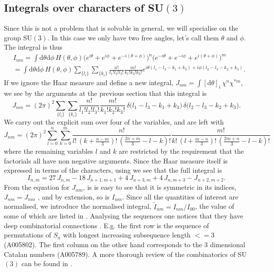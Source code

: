 \subsection{Integrals over characters of SU\texorpdfstring{$(3)$}{(3)}}

Since this is not a problem that is solvable in general, we will specialise on
the group SU$(3)$. In this case we only have two free angles, let's call them
$\theta$ and $\phi$. The integral is thus
%
\begin{align}
  &I_{nm} = \int \mathrm{d} \theta \mathrm{d} \phi \, H(\theta,\phi)
  \big(e^{i\theta} + e^{i\phi} + e^{-i(\theta + \phi)}\big)^n
  \big(e^{-i\theta} + e^{-i\phi} + e^{i(\theta + \phi)}\big)^m \nonumber\\
  &=\int \mathrm{d} \theta \mathrm{d} \phi \, H(\theta,\phi)
  \sum_{\{l_i\}} \sum_{\{k_i\}} \frac{n!}{l_1! l_2! l_3!} \frac{m!}{k_1! k_2!
    k_3!} e^{i \theta (l_1 - l_3 - k_1 + k_3) + i \phi (l_2 - l_3 - k_2 + k_3)}.
\end{align}
%
If we ignore the Haar measure and define a new integral, $J_{nm} = \int
[\mathrm{d} \theta]_i\, \chi^n \chi^{*m}$, we see by the arguments at the previous
section that this integral is
%
\begin{equation}
  J_{nm} = (2\pi)^2 \sum_{\{l_i\}} \sum_{\{k_i\}}
    \frac{n!}{l_1! l_2! l_3!} \frac{m!}{k_1! k_2!k_3!}\,
    \delta\big(l_1 - l_3 - k_1 + k_3\big)\, \delta\big(l_2 - l_3 - k_2 + k_3\big).
\end{equation}
%
We carry out the explicit sum over four of the variables, and are left
with
%
\begin{equation}
  J_{nm} = (2\pi)^2 \sum_{l = 0}^n \sum_{k = 0}^m
    \frac{n!}{l!\, (k + \frac{n-m}{3})!\,(\frac{2n+m}{3} - l - k)!}
    \frac{m!}{k!\, (l + \frac{m-n}{3})!\,(\frac{2m+n}{3} - l - k)!}
\end{equation}
%
where the remaining variables $l$ and $k$ are restricted by the requirement that
the factorials all have non negative arguments. Since the Haar measure itself is
expressed in terms of the characters, using  we see
that the full integral is
%
\begin{equation}
  I_{n,m} = 27\, J_{n,m} - 18\, J_{n+1,m+1} + 4\, J_{n+3,m} + 4\, J_{n,m+3} - J_{n+2,m+2}.
\end{equation}
%
From the equation for $J_{nm}$, is is easy to see that it is symmetric in its
indices, $J_{nm} = J_{mn}$ , and by extension, so is $I_{nm}$. Since all the
quantities of interest are normalised, we introduce the normalised integral,
$\tilde{I}_{nm} = I_{nm} / I_{00}$, the value of some of which are listed in 
. Analysing the sequences one notices that they
have deep combinatorial connections \citep{OEIS}. E.g. the first row is the sequence of
permutations of $S_n$ with longest increasing subsequence length $<=3$
(A005802). The first column on the other hand corresponds to the 3 dimensional
Catalan numbers (A005789). A more thorough review of the combinatorics of
SU$(3)$ can be found in \citep{Unger:2014oga}.

